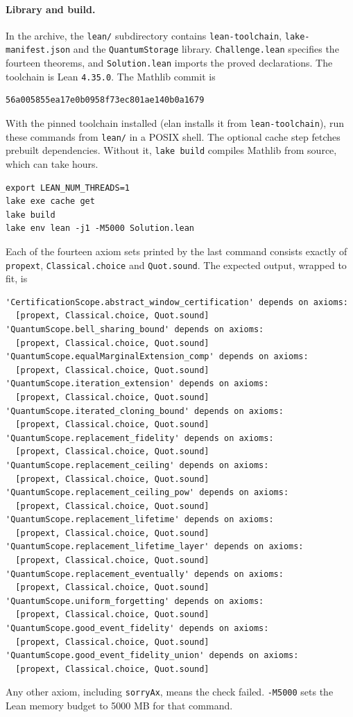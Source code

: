 \paragraph{Library and build.}
In the archive, the \texttt{lean/} subdirectory contains \texttt{lean-toolchain}, \texttt{lake-manifest.json} and the \texttt{QuantumStorage} library. \texttt{Challenge.lean} specifies the fourteen theorems, and \texttt{Solution.lean} imports the proved declarations.
The toolchain is Lean \texttt{4.35.0}. The Mathlib commit is
\begin{verbatim}
56a005855ea17e0b0958f73ec801ae140b0a1679
\end{verbatim}
With the pinned toolchain installed (elan installs it from \texttt{lean-toolchain}), run these commands from \texttt{lean/} in a POSIX shell. The optional cache step fetches prebuilt dependencies. Without it,
\texttt{lake build} compiles Mathlib from source, which can take hours.
\begin{verbatim}
export LEAN_NUM_THREADS=1
lake exe cache get
lake build
lake env lean -j1 -M5000 Solution.lean
\end{verbatim}
Each of the fourteen axiom sets printed by the last command consists exactly of \texttt{propext}, \texttt{Classical.choice} and \texttt{Quot.sound}. The expected output, wrapped to fit, is
{\small
\begin{verbatim}
'CertificationScope.abstract_window_certification' depends on axioms:
  [propext, Classical.choice, Quot.sound]
'QuantumScope.bell_sharing_bound' depends on axioms:
  [propext, Classical.choice, Quot.sound]
'QuantumScope.equalMarginalExtension_comp' depends on axioms:
  [propext, Classical.choice, Quot.sound]
'QuantumScope.iteration_extension' depends on axioms:
  [propext, Classical.choice, Quot.sound]
'QuantumScope.iterated_cloning_bound' depends on axioms:
  [propext, Classical.choice, Quot.sound]
'QuantumScope.replacement_fidelity' depends on axioms:
  [propext, Classical.choice, Quot.sound]
'QuantumScope.replacement_ceiling' depends on axioms:
  [propext, Classical.choice, Quot.sound]
'QuantumScope.replacement_ceiling_pow' depends on axioms:
  [propext, Classical.choice, Quot.sound]
'QuantumScope.replacement_lifetime' depends on axioms:
  [propext, Classical.choice, Quot.sound]
'QuantumScope.replacement_lifetime_layer' depends on axioms:
  [propext, Classical.choice, Quot.sound]
'QuantumScope.replacement_eventually' depends on axioms:
  [propext, Classical.choice, Quot.sound]
'QuantumScope.uniform_forgetting' depends on axioms:
  [propext, Classical.choice, Quot.sound]
'QuantumScope.good_event_fidelity' depends on axioms:
  [propext, Classical.choice, Quot.sound]
'QuantumScope.good_event_fidelity_union' depends on axioms:
  [propext, Classical.choice, Quot.sound]
\end{verbatim}
}
Any other axiom, including \texttt{sorryAx}, means the check failed.
\texttt{-M5000} sets the Lean memory budget to 5000 MB for that command.

